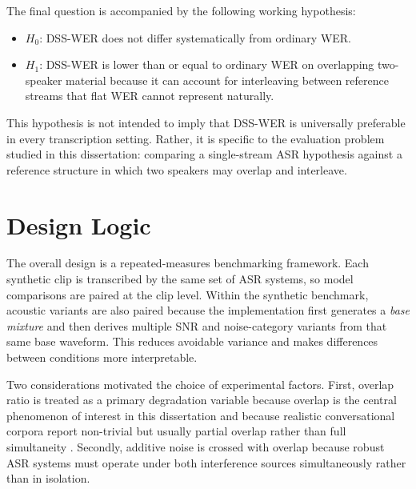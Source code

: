 The final question is accompanied by the following working hypothesis:
\begin{itemize}
    \item \textbf{$H_0$}: DSS-WER does not differ systematically from ordinary WER.
    \item \textbf{$H_1$}: DSS-WER is lower than or equal to ordinary WER on overlapping two-speaker material because it can account for interleaving between reference streams that flat WER cannot represent naturally.
\end{itemize}

This hypothesis is not intended to imply that DSS-WER is universally preferable in every transcription setting. Rather, it is specific to the evaluation problem studied in this dissertation: comparing a single-stream ASR hypothesis against a reference structure in which two speakers may overlap and interleave.

\section{Design Logic}
The overall design is a repeated-measures benchmarking framework. Each synthetic clip is transcribed by the same set of ASR systems, so model comparisons are paired at the clip level. Within the synthetic benchmark, acoustic variants are also paired because the implementation first generates a \emph{base mixture} and then derives multiple SNR and noise-category variants from that same base waveform. This reduces avoidable variance and makes differences between conditions more interpretable.

Two considerations motivated the choice of experimental factors. First, overlap ratio is treated as a primary degradation variable because overlap is the central phenomenon of interest in this dissertation and because realistic conversational corpora report non-trivial but usually partial overlap rather than full simultaneity \citep{Shriberg2001ObservationsOO, chen2020continuousspeechseparationdataset}. Secondly, additive noise is crossed with overlap because robust ASR systems must operate under both interference sources simultaneously rather than in isolation.

